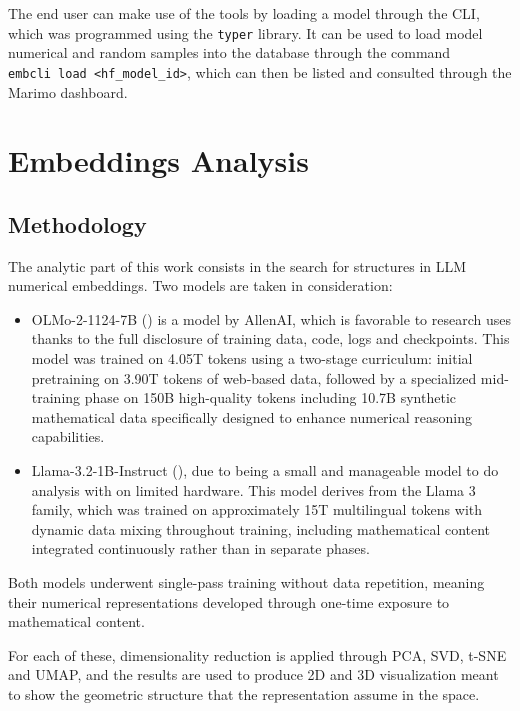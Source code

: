 \documentclass[
  a4paper, twoside, 10pt, titlepage]{book}
\begin{document}
The end user can make use of the tools by loading a model through the
CLI, which was programmed using the \texttt{typer} library. It can be
used to load model numerical and random samples into the database
through the command
\texttt{embcli\ load\ \textless{}hf\_model\_id\textgreater{}}, which can
then be listed and consulted through the Marimo dashboard.

\chapter{Embeddings Analysis}\label{embeddings-analysis}

\section{Methodology}\label{methodology}

The analytic part of this work consists in the search for structures in
LLM numerical embeddings. Two models are taken in consideration:

\begin{itemize}
\item
  OLMo-2-1124-7B () is a model
  by AllenAI, which is favorable to research uses thanks to the full
  disclosure of training data, code, logs and checkpoints. This model
  was trained on 4.05T tokens using a two-stage curriculum: initial
  pretraining on 3.90T tokens of web-based data, followed by a
  specialized mid-training phase on 150B high-quality tokens including
  10.7B synthetic mathematical data specifically designed to enhance
  numerical reasoning capabilities.
\item
  Llama-3.2-1B-Instruct (), due to being a small and manageable model to do analysis
  with on limited hardware. This model derives from the Llama 3 family,
  which was trained on approximately 15T multilingual tokens with
  dynamic data mixing throughout training, including mathematical
  content integrated continuously rather than in separate phases.
\end{itemize}

Both models underwent single-pass training without data repetition,
meaning their numerical representations developed through one-time
exposure to mathematical content.

For each of these, dimensionality reduction is applied through PCA, SVD,
t-SNE and UMAP, and the results are used to produce 2D and 3D
visualization meant to show the geometric structure that the
representation assume in the space.
\end{document}
